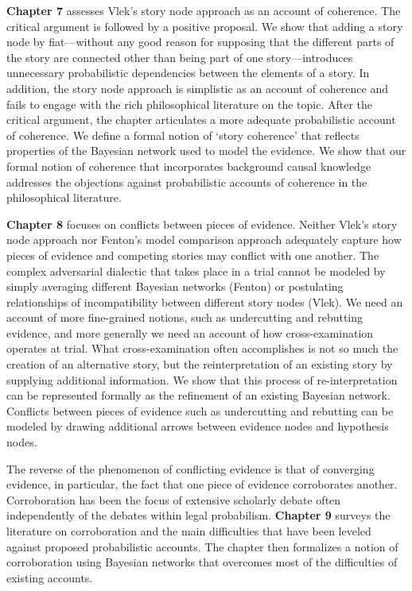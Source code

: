 \documentclass[
  10pt,
  dvipsnames,enabledeprecatedfontcommands]{scrartcl}
\begin{document}
\textbf{Chapter 7} assesses Vlek's story node approach as an account of
coherence. The critical argument is followed by a positive proposal. We
show that adding a story node by fiat---without any good reason for
supposing that the different parts of the story are connected other than
being part of one story---introduces unnecessary probabilistic
dependencies between the elements of a story. In addition, the story
node approach is simplistic as an account of coherence and fails to
engage with the rich philosophical literature on the topic. After the
critical argument, the chapter articulates a more adequate probabilistic
account of coherence. We define a formal notion of `story coherence'
that reflects properties of the Bayesian network used to model the
evidence. We show that our formal notion of coherence
 that
incorporates background causal knowledge addresses the objections
against probabilistic accounts of coherence in the philosophical
literature.

\textbf{Chapter 8} focuses on conflicts between pieces of evidence.
Neither Vlek's story node approach nor Fenton's model comparison
approach adequately capture how pieces of evidence and competing stories
may conflict with one another. The complex adversarial dialectic that
takes place in a trial cannot be modeled by simply averaging different
Bayesian networks (Fenton) or postulating relationships of
incompatibility between different story nodes (Vlek). We need an account
of more fine-grained notions, such as undercutting and rebutting
evidence, and more generally we need an account of how cross-examination
operates at trial. What cross-examination often accomplishes is not so
much the creation of an alternative story, but the reinterpretation of
an existing story by supplying additional information. We show that this
process of re-interpretation can be represented formally as the
refinement of an existing Bayesian network. Conflicts between pieces of
evidence such as undercutting and rebutting can be modeled by drawing
additional arrows between evidence nodes and hypothesis nodes.

The reverse of the phenomenon of conflicting evidence is that of
converging evidence, in particular, the fact that one piece of evidence
corroborates another. Corroboration has been the focus of extensive
scholarly debate often independently of the debates within legal
probabilism. \textbf{Chapter 9} surveys the literature on corroboration
and the main difficulties that have been leveled against proposed
probabilistic accounts. The chapter then formalizes a notion of
corroboration using Bayesian networks that overcomes most of the
difficulties of existing accounts.
\end{document}
